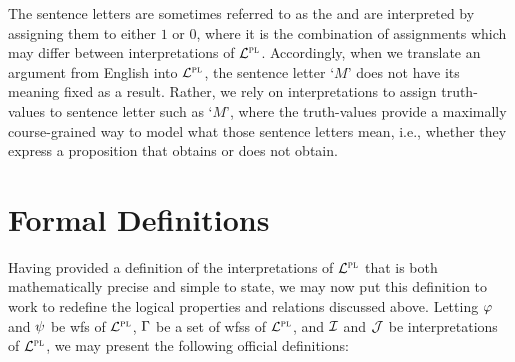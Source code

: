 The sentence letters are sometimes referred to as the  and are interpreted by assigning them to either $1$ or $0$, where it is the combination of assignments which may differ between interpretations of $\mathcal{L}^{\textsc{pl}}$.
Accordingly, when we translate an argument from English into $\mathcal{L}^{\textsc{pl}}$, the sentence letter `$M$' does not have its meaning fixed as a result.
Rather, we rely on interpretations to assign truth-values to sentence letter such as `$M$', where the truth-values provide a maximally course-grained way to model what those sentence letters mean, i.e., whether they express a proposition that obtains or does not obtain.




\section{Formal Definitions}
  \label{sec:Definitions}

Having provided a definition of the interpretations of $\mathcal{L}^{\textsc{pl}}$ that is both mathematically precise and simple to state, we may now put this definition to work to redefine the logical properties and relations discussed above.
Letting $\varphi$ and $\psi$ be wfs of $\mathcal{L}^{\textsc{pl}}$, $\Gamma$ be a set of wfss of $\mathcal{L}^{\textsc{pl}}$, and $\mathcal{I}$ and $\mathcal{J}$ be interpretations of $\mathcal{L}^{\textsc{pl}}$, we may present the following official definitions: 

